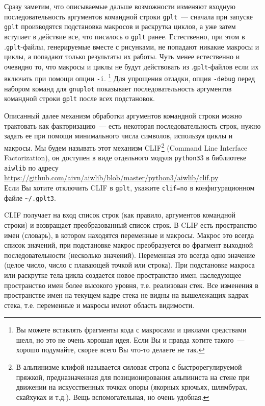 \documentclass[12pt]{article}
\def\gplt{{\tt gplt}}
\def\gnuplot{{\tt gnuplot}}
\def\python{{\tt python3}}
\begin{document}
Сразу заметим, что описываемые дальше возможности
изменяют входную последовательность аргументов командной строки \gplt~--- сначала при запуске \gplt{} производятся подстановка макросов и
раскрутка циклов, а уже затем вступает в действие все, что писалось о \gplt{} ранее. Естественно, при этом
в .\gplt-файлы, генерируемые вместе с рисунками, не попадают никакие макросы и циклы, а попадают только результаты их работы.
Чуть менее естественно и очевидно то, что
макросы и циклы не будут действовать из .\gplt-файлов если их включать при помощи опции \verb'-i'.
\footnote{Вы можете вставлять фрагменты кода с макросами и циклами средствами шелл, но это не очень хорошая идея. Если Вы и правда хотите такого~---
хорошо подумайте, скорее всего Вы что-то делаете не так.}
Для упрощения отладки, опция \verb'-debug' перед набором команд для \gnuplot{} показывает
последовательность аргументов командной строки \gplt{} после всех подстановок.

Описанный далее механизм обработки аргументов командной строки можно трактовать как факторизацию~--- есть некоторая последовательность строк,
нужно задать ее при помощи минимального числа символов, используя циклы и макросы. Мы будем называть этот механизм
CLIF\footnote{В альпинизме клифой называется силовая стропа с быстрорегулируемой пряжкой, предназначенная для позиционирования
  альпиниста на стене при движении на искусственных точках опоры (якорных крючьях, шлямбурах, скайхуках и т.д.). Вещь вспомогательная,
  но очень удобная.}
(Command Line Interface Factorization), он доступен в виде отдельного модуля \python3{} в библиотеке \verb'aiwlib' по адресу\\
\url{https://github.com/aivn/aiwlib/blob/master/python3/aiwlib/clif.py}\\
Если Вы хотите отключить CLIF в \gplt, укажите \verb'clif=no' в конфигурационном файле \verb'~/.gplt3'.

CLIF получает на вход список строк (как правило, аргументов командной строки) и возвращает преобразованный список строк.
В CLIF есть пространство имен (словарь), в котором находятся переменные и макросы. Макрос это всегда список значений, при подстановке макрос
преобразуется во фрагмент выходной последовательности (несколько значений). Переменная это всегда одно значение (целое число, число с плавающей точкой или строка).
При подстановке макроса или раскрутке тела цикла создается новое пространство имен, наследующее пространство имен более высокого уровня, т.е. реализован стек.
Все изменения в пространстве имен на текущем кадре стека не видны на вышележащих кадрах стека, т.е. переменные и макросы имеют область видимости.
\end{document}
